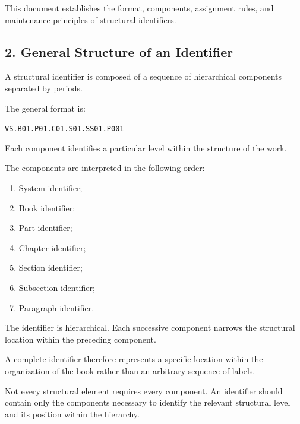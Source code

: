 This document establishes the format, components,
assignment rules, and maintenance principles of
structural identifiers.


\subsection*{2. General Structure of an Identifier}

A structural identifier is composed of a sequence
of hierarchical components separated by periods.

The general format is:

\begin{center}
    \texttt{VS.B01.P01.C01.S01.SS01.P001}
\end{center}

Each component identifies a particular level
within the structure of the work.

The components are interpreted in the following
order:

\begin{enumerate}
    \item System identifier;
    \item Book identifier;
    \item Part identifier;
    \item Chapter identifier;
    \item Section identifier;
    \item Subsection identifier;
    \item Paragraph identifier.
\end{enumerate}

The identifier is hierarchical. Each successive
component narrows the structural location within
the preceding component.

A complete identifier therefore represents
a specific location within the organization
of the book rather than an arbitrary sequence
of labels.

Not every structural element requires every
component. An identifier should contain only
the components necessary to identify the
relevant structural level and its position
within the hierarchy.


